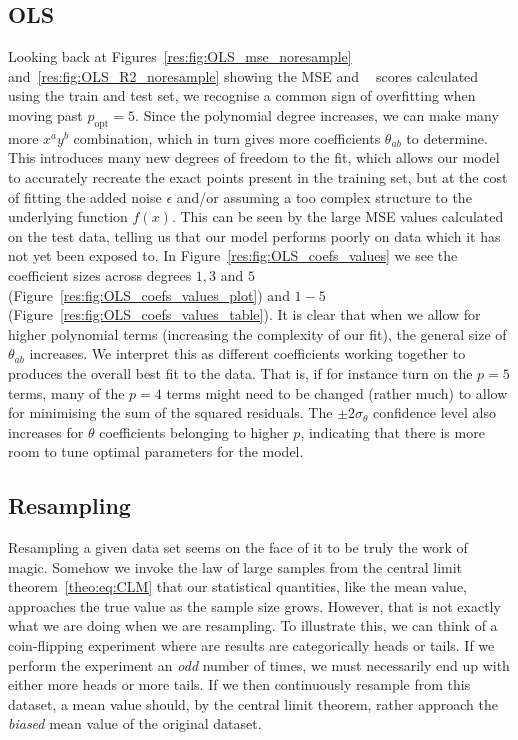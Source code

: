 \documentclass[twocolumn,english,notitlepage]{article}
\DeclareMathOperator{\Rsquared}{R^2}
\newcommand{\msub}[2]{\ensuremath{{#1}_\text{#2}}}
\begin{document}
    \subsection{OLS}
        Looking back at Figures~\ref{res:fig:OLS_mse_noresample} and~\ref{res:fig:OLS_R2_noresample} showing the MSE and $\Rsquared$ scores calculated using the train and test set, we recognise a common sign of overfitting when moving past $\msub{p}{opt} = 5$. Since the polynomial degree increases, we can make many more $x^ay^b$ combination, which in turn gives more coefficients $\theta_{ab}$ to determine. This introduces many new degrees of freedom to the fit, which allows our model to accurately recreate the exact points present in the training set, but at the cost of fitting the added noise $\epsilon$ and/or assuming a too complex structure to the underlying function $f(x)$. This can be seen by the large MSE values calculated on the test data, telling us that our model performs poorly on data which it has not yet been exposed to. In Figure~\ref{res:fig:OLS_coefs_values} we see the coefficient sizes across degrees $1,3$ and $5$ (Figure~\ref{res:fig:OLS_coefs_values_plot}) and $1-5$ (Figure~\ref{res:fig:OLS_coefs_values_table}). It is clear that when we allow for higher polynomial terms (increasing the complexity of our fit), the general size of $\theta_{ab}$ increases. We interpret this as different coefficients working together to produces the overall best fit to the data. That is, if for instance turn on the $p=5$ terms, many of the $p=4$ terms might need to be changed (rather much) to allow for minimising the sum of the squared residuals. The $\pm 2\sigma_{\theta}$ confidence level also increases for $\theta$ coefficients belonging to higher $p$, indicating that there is more room to tune optimal parameters for the model.       

    \subsection{Resampling}
        Resampling a given data set seems on the face of it to be truly the work of magic. Somehow we invoke the law of large samples from the central limit theorem~\eqref{theo:eq:CLM} that our statistical quantities, like the mean value, approaches the true value as the sample size grows. However, that is not exactly what we are doing when we are resampling. To illustrate this, we can think of a coin-flipping experiment where are results are categorically heads or tails. If we perform the experiment an \textit{odd} number of times, we must necessarily end up with either more heads or more tails. If we then continuously resample from this dataset, a mean value should, by the central limit theorem, rather approach the \textit{biased} mean value of the original dataset.
\end{document}
